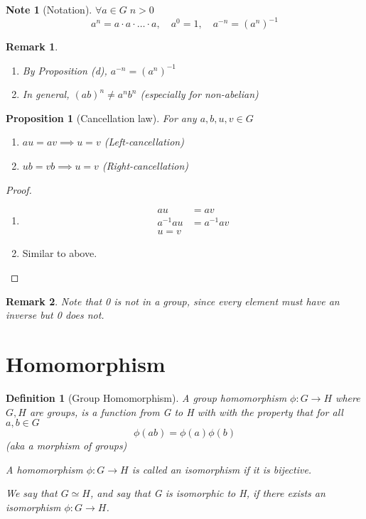 \documentclass[11pt, oneside]{book}
\theoremstyle{break}
\newtheorem*{proof}{Proof}
\newtheorem{propo}{Proposition}[section]
\newtheorem*{remark}{Remark}
\newtheorem*{note}{Note}
\newtheorem{defn}{Definition}[section]
\begin{document}
\begin{note}[Notation]
    $\forall a \in G \; n > 0$
    \begin{equation*}
        a^n = a \cdot a \cdot \hdots \cdot a, \quad a^0 = 1, \quad a^{-n} = (a^n)^{-1}
    \end{equation*}
\end{note}

\begin{remark}
    \begin{enumerate}
        \item By Proposition (d), $a^{-n} = (a^n)^{-1}$
        \item In general, $(ab)^n \neq a^n b^n$ (especially for non-abelian)
    \end{enumerate}
\end{remark}

\begin{propo}[Cancellation law]
    For any $a, b, u, v \in G$
    \begin{enumerate}
        \item $au = av \implies u = v$ (Left-cancellation)
        \item $ub = vb \implies u = v$ (Right-cancellation)
    \end{enumerate}
\end{propo}

\begin{proof}
    \begin{enumerate}
        \item \begin{align*}
            au &= av \\
            a^{-1}au &= a^{-1}av \\
            u = v
        \end{align*}
        \item Similar to above.
    \end{enumerate}
\end{proof}

\begin{remark}
    Note that 0 is not in a group, since every element must have an inverse but 0 does not.
\end{remark}

\section{Homomorphism}

\begin{defn}[Group Homomorphism]
    A group homomorphism $\phi : G \to H$ where $G, H$ are groups, is a function from G to H with with the property that for all $a, b \in G$
    \begin{equation*}
        \phi(ab) = \phi(a)\phi(b)
    \end{equation*}
    (aka a morphism of groups)

    A homomorphism $\phi: G \to H$ is called an isomorphism if it is bijective.

    We say that $G \simeq H$, and say that G is isomorphic to H, if there exists an isomorphism $\phi: G \to H$.
\end{defn}
\end{document}
